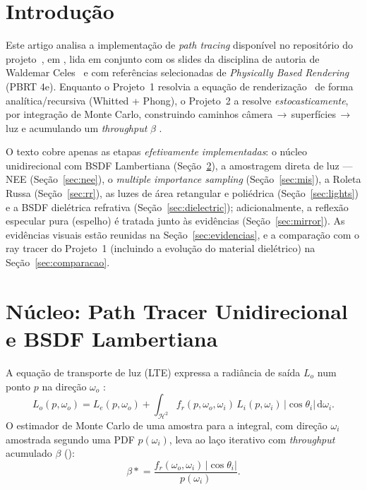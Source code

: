 \documentclass[portuguese]{sbcreviews-2025}%
\makeatletter
\newcommand{\pbrtcontentsurl}{https://pbr-book.org/4ed/contents.html}
\newcommand{\pbrtsectionurl}[1]{%
    \ifcsname pbrturl@#1\endcsname
        \csname pbrturl@#1\endcsname
    \else
        \pbrtcontentsurl
    \fi
}
\newcommand{\pbrtbook}{\emph{Physically Based Rendering} (PBRT 4e)}
\newcommand{\pbrtsec}[1]{\citep[\href{\pbrtsectionurl{#1}}{Se\c{c}\~ao~#1}]{pharr2023pbrt}}
\newcommand{\pbrtsecs}[1]{\citep[\href{\pbrtcontentsurl}{Se\c{c}\~oes~#1}]{pharr2023pbrt}}
\makeatother
\begin{document}
\section{Introdução}
\label{sec:introducao}

Este artigo analisa a implementação de \emph{path tracing} disponível no repositório do
projeto~\citep{inf2608projectrepo}, em , lida em conjunto com os
slides da disciplina de autoria de Waldemar Celes~\citep{inf2608slides07,inf2608slides08,inf2608slides09}
e com referências selecionadas de \pbrtbook. Enquanto o Projeto~1 resolvia a equação de
renderização~\citep{kajiya1986rendering} de forma analítica/recursiva (Whitted + Phong), o
Projeto~2 a resolve \emph{estocasticamente}, por integração de Monte Carlo, construindo
caminhos câmera\,$\to$\,superfícies\,$\to$\,luz e acumulando um \emph{throughput} $\beta$
\pbrtsecs{13.1, 13.2, 13.3}.

O texto cobre apenas as etapas \emph{efetivamente implementadas}: o núcleo unidirecional com
BSDF Lambertiana (Seção~\ref{sec:core}), a amostragem direta de luz — NEE (Seção~\ref{sec:nee}),
o \emph{multiple importance sampling} (Seção~\ref{sec:mis}), a Roleta Russa
(Seção~\ref{sec:rr}), as luzes de área retangular e poliédrica (Seção~\ref{sec:lights}) e a
BSDF dielétrica refrativa (Seção~\ref{sec:dielectric}); adicionalmente, a reflexão especular
pura (espelho) é tratada junto às evidências (Seção~\ref{sec:mirror}). As evidências visuais estão
reunidas na Seção~\ref{sec:evidencias}, e a comparação com o ray tracer do Projeto~1 (incluindo
a evolução do material dielétrico) na Seção~\ref{sec:comparacao}.

\section{Núcleo: Path Tracer Unidirecional e BSDF Lambertiana}
\label{sec:core}

A equação de transporte de luz (LTE) expressa a radiância de saída $L_o$ num ponto $p$ na
direção $\omega_o$ \pbrtsec{13.1}:
\begin{equation}
L_o(p,\omega_o) = L_e(p,\omega_o) + \int_{\mathcal{H}^2} f_r(p,\omega_o,\omega_i)\,L_i(p,\omega_i)\,\lvert\cos\theta_i\rvert\,\mathrm{d}\omega_i .
\label{eq:lte}
\end{equation}
O estimador de Monte Carlo de uma amostra para a integral, com direção $\omega_i$ amostrada
segundo uma PDF $p(\omega_i)$, leva ao laço iterativo com \emph{throughput} acumulado
$\beta$ \pbrtsec{13.3} ():
\begin{equation}
\beta \mathrel{\ast}= \frac{f_r(\omega_o,\omega_i)\,\lvert\cos\theta_i\rvert}{p(\omega_i)} .
\label{eq:throughput}
\end{equation}
\end{document}
